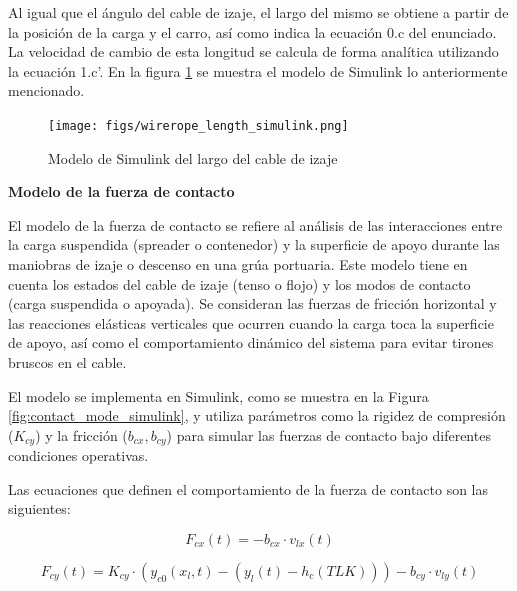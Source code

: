 \documentclass{article}
\begin{document}
            Al igual que el ángulo del cable de izaje, el largo del mismo se obtiene a partir de la posición de la carga y el carro, así como indica la ecuación 0.c del enunciado. La velocidad de cambio de esta longitud se calcula de forma analítica utilizando la ecuación 1.c'. En la figura \ref{fig:wirerope_length_simulink} se muestra el modelo de Simulink lo anteriormente mencionado.

            \begin{figure} [H]
                \centering
                \texttt{[image: figs/wirerope\_length\_simulink.png]}
                \caption{Modelo de Simulink del largo del cable de izaje}
                \label{fig:wirerope_length_simulink}
            \end{figure}

            \textbf{Modelo de la fuerza de contacto}

            El modelo de la fuerza de contacto se refiere al análisis de las interacciones entre la carga suspendida (spreader o contenedor) y la superficie de apoyo durante las maniobras de izaje o descenso en una grúa portuaria. Este modelo tiene en cuenta los estados del cable de izaje (tenso o flojo) y los modos de contacto (carga suspendida o apoyada). Se consideran las fuerzas de fricción horizontal y las reacciones elásticas verticales que ocurren cuando la carga toca la superficie de apoyo, así como el comportamiento dinámico del sistema para evitar tirones bruscos en el cable.

            El modelo se implementa en Simulink, como se muestra en la Figura \ref{fig:contact_mode_simulink}, y utiliza parámetros como la rigidez de compresión ($K_{cy}$) y la fricción ($b_{cx}, b_{cy}$) para simular las fuerzas de contacto bajo diferentes condiciones operativas. 

            Las ecuaciones que definen el comportamiento de la fuerza de contacto son las siguientes:

            \begin{equation}
            F_{cx}(t) = -b_{cx} \cdot v_{lx}(t)
            \end{equation}

            \begin{equation}
            F_{cy}(t) = K_{cy} \cdot (y_{c0}(x_l, t) - (y_l(t) - h_c(TLK))) - b_{cy} \cdot v_{ly}(t)
            \end{equation}
\end{document}
